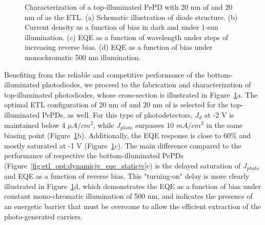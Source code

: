 \begin{figure}[ht!]
    \caption[Overview of electrical characterization for a top-illuminated PePD that features 20 nm of  and 20 nm of  as the ETL.]{Characterization of a top-illuminated PePD with 20 nm of  and 20 nm of  as the ETL. (a) Schematic illustration of diode structure. (b) Current density as a function of bias in dark and under 1-sun illumination. (c) EQE as a function of wavelength under steps of increasing reverse bias. (d) EQE as a function of bias under monochromatic 500 nm illumination.}
    \label{fig:pix_pepd:cross_section_performance}
\end{figure}

Benefiting from the reliable and competitive performance of the bottom-illuminated photodiodes, we proceed to the fabrication and characterization of top-illuminated photodiodes, whose cross-section is illustrated in Figure~\ref{fig:pix_pepd:cross_section_performance}a. The optimal ETL configuration of 20 nm of  and 20 nm of  is selected for the top-illuminated PePDs, as well. For this type of photodetectors, $J_d$ at -2 V is maintained below 4 $\mu A/cm^2$, while $J_{photo}$ surpasses 10 $mA/cm^2$ in the same biasing point (Figure~\ref{fig:pix_pepd:cross_section_performance}b). Additionally, the EQE response is close to 60\% and mostly saturated at -1 V (Figure~\ref{fig:pix_pepd:cross_section_performance}c). The main difference compared to the performance of respective the bottom-illuminated PePDs (Figure~\ref{fig:etl_opt:dynamicjv_eqe_staticjv}c) is the delayed saturation of $J_{photo}$ and EQE as a function of reverse bias. This "turning-on" delay is more clearly illustrated in Figure~\ref{fig:pix_pepd:cross_section_performance}d, which demonstrates the EQE as a function of bias under constant mono-chromatic illumination of 500 nm, and indicates the presence of an energetic barrier that must be overcome to allow the efficient extraction of the photo-generated carriers. 

